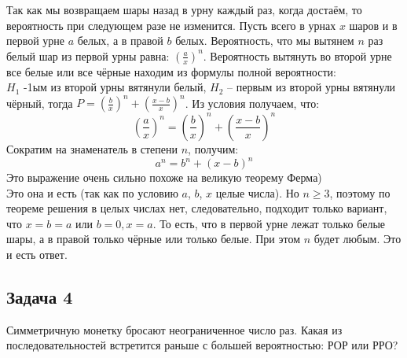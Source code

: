 \documentclass[a4paper,12pt]{article} %
\begin{document}
Так как мы возвращаем шары назад в урну каждый раз, когда достаём, то вероятность при следующем разе не изменится. Пусть всего в урнах $ x $ шаров и в первой урне $ a $ белых, а в правой $ b $ белых. Вероятность, что мы вытянем $ n $ раз белый шар из первой урны равна: $ \left(\frac{a}{x}\right)^n $. Вероятность вытянуть во второй урне все белые или все чёрные находим из формулы полной вероятности:\\
$ H_1 $ -1ым из второй урны вятянули белый, $ H_2 $ -- первым из второй урны вятянули чёрный, тогда $ P = \left(\frac{b}{x}\right)^n + \left(\frac{x-b}{x}\right)^n $. Из условия получаем, что:
$$
\left(\frac{a}{x}\right)^n = \left(\frac{b}{x}\right)^n + \left(\frac{x-b}{x}\right)^n
$$
Сократим на знаменатель в степени $ n $, получим:
$$
a^n = b^n + (x-b)^n
$$
Это выражение очень сильно похоже на великую теорему Ферма) \\
Это она и есть (так как по условию $ a $, $ b $, $ x $ целые числа). Но $n \geq 3$, поэтому по теореме решения в целых числах нет, следовательно, подходит только вариант, что $ x = b = a $ или $ b = 0, x = a $. То есть, что в первой урне лежат только белые шары, а в правой только чёрные или только белые. При этом $ n $ будет любым. Это и есть ответ.

\subsection*{Задача 4}
Симметричную монетку бросают неограниченное число раз. Какая из последовательностей встретится раньше с большей вероятностью: РОР или РРО? \\
\end{document}
